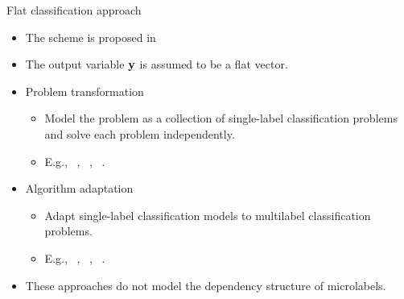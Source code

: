 \documentclass[first=dgreen,second=purple,logo=red]{aaltoslides}
\begin{document}
%
\begin{frame}{Flat classification approach}
	\begin{itemize}\footnotesize
		\item The scheme is proposed in \cite{Tsoumakas10mining}
		\item The output variable $\mathbf {y}$ is assumed to be a flat vector.
		\item Problem transformation
		\begin{itemize}\footnotesize
			\item Model the problem as a collection of single-label classification problems and solve each problem independently.
			\item E.g., \mlknn\ \cite{Zhang07mlknn}, \cc\ \cite{Read11classifier}, \iblr\ \cite{Cheng09combining}.
		\end{itemize}
		\item Algorithm adaptation 
		\begin{itemize}\footnotesize
			\item Adapt single-label classification models to multilabel classification problems.
			\item E.g., \corrlog\ \cite{Bian12corrlog}, \mtl\ \cite{Argyriou08convex}, \adaboostmh\ \cite{Schapire99improved,Esuli2008boosting}.
		\end{itemize}
		\item These approaches do not model the dependency structure of microlabels.
	\end{itemize}
\end{frame}
\end{document}
